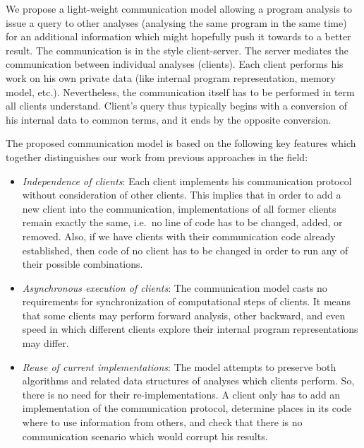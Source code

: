 \documentclass[envcountsame]{llncs}
\begin{document}
We propose a light-weight communication model allowing a program analysis to
issue a query to other analyses (analysing the same program in the same time)
for an additional information which might hopefully push it towards to a better
result. The communication is in the style client-server. The server mediates the
communication between individual analyses (clients). Each client performs his
work on his own private data (like internal program representation, memory
model, etc.). Nevertheless, the communication itself has to be performed in term
all clients understand. Client's query thus typically begins with a conversion
of his internal data to common terms, and it ends by the opposite conversion.

The proposed communication model is based on the following key features which
together distinguishes our work from previous approaches in the field: \begin{itemize}
\item \emph{Independence of clients}: Each client implements his communication
protocol without consideration of other clients. This implies that in order to
add a new client into the communication, implementations of all former clients
remain exactly the same, i.e.~no line of code has to be changed, added, or
removed. Also, if we have  clients with their communication code
already established, then code of no client has to be changed in order to run
any of  their possible combinations. \item \emph{Asynchronous execution of clients}: The communication model casts no
requirements for synchronization of computational steps of clients. It means
that some clients may perform forward analysis, other backward, and even speed
in which different clients explore their internal program representations may
differ. \item \emph{Reuse of current implementations}: The model attempts to preserve
both algorithms and related data structures of analyses which clients perform.
So, there is no need for their re-implementations. A client only has to add an
implementation of the communication protocol, determine places in its code where
to use information from others, and check that there is no communication
scenario which would corrupt his results.
\end{itemize}
\end{document}

